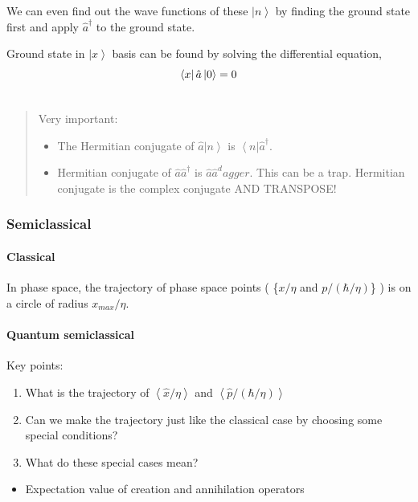 \documentclass[letterpaper,10pt,english]{sphinxmanual}
\newcommand{\bra}[1]{\left\langle #1\right|}
\newcommand{\ket}[1]{\left| #1\right\rangle}
\begin{document}
We can even find out the wave functions of these $\ket{n}$ by finding the ground state first and apply $\hat a^\dagger$ to the ground state.

Ground state in ${\ket{x}}$ basis can be found by solving the differential equation,
\begin{gather}
\begin{split}\bra{x} \hat a \ket{0} = 0\end{split}\notag\\\begin{split}\end{split}\notag
\end{gather}\begin{quote}

Very important:
\begin{itemize}
\item {} 
The Hermitian conjugate of $\hat a \ket{n}$ is $\bra{n} \hat a^\dagger$.

\item {} 
Hermitian conjugate of $\hat a \hat a^\dagger$ is $\hat a \hat a^dagger$. This can be a trap. Hermitian conjugate is the complex conjugate AND TRANSPOSE!

\end{itemize}
\end{quote}


\subsubsection{Semiclassical}
\label{QuantumMechanics:semiclassical}

\paragraph{Classical}
\label{QuantumMechanics:classical}
In phase space, the trajectory of phase space points ( \{$x/\eta$ and $p/(\hbar/\eta)$\} ) is on a circle of radius $x_{max}/\eta$.


\paragraph{Quantum semiclassical}
\label{QuantumMechanics:quantum-semiclassical}
Key points:
\begin{enumerate}
\item {} 
What is the trajectory of $\left<\hat x/\eta\right>$ and $\left<\hat p/(\hbar/\eta)\right>$

\item {} 
Can we make the trajectory just like the classical case by choosing some special conditions?

\item {} 
What do these special cases mean?

\end{enumerate}
\begin{itemize}
\item {} 
Expectation value of creation and annihilation operators

\end{itemize}
\end{document}
